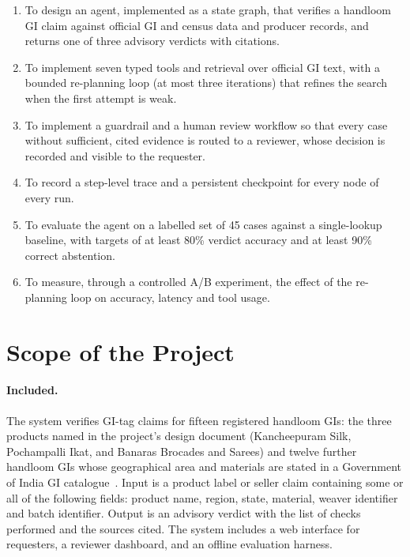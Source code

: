 \begin{enumerate}[itemsep=2pt]
\item To design an agent, implemented as a state graph, that verifies a handloom GI claim against
official GI and census data and producer records, and returns one of three advisory verdicts with
citations.
\item To implement seven typed tools and retrieval over official GI text, with a bounded re-planning
loop (at most three iterations) that refines the search when the first attempt is weak.
\item To implement a guardrail and a human review workflow so that every case without sufficient,
cited evidence is routed to a reviewer, whose decision is recorded and visible to the requester.
\item To record a step-level trace and a persistent checkpoint for every node of every run.
\item To evaluate the agent on a labelled set of 45 cases against a single-lookup baseline, with
targets of at least 80\% verdict accuracy and at least 90\% correct abstention.
\item To measure, through a controlled A/B experiment, the effect of the re-planning loop on accuracy,
latency and tool usage.
\end{enumerate}

\section{Scope of the Project}

\paragraph{Included.} The system verifies GI-tag claims for fifteen registered handloom GIs: the three
products named in the project's design document (Kancheepuram Silk, Pochampalli Ikat, and Banaras
Brocades and Sarees) and twelve further handloom GIs whose geographical area and materials are stated
in a Government of India GI catalogue~\cite{pibgi}. Input is a product label or seller claim
containing some or all of the following fields: product name, region, state, material, weaver
identifier and batch identifier. Output is an advisory verdict with the list of checks performed and
the sources cited. The system includes a web interface for requesters, a reviewer dashboard, and an
offline evaluation harness.

